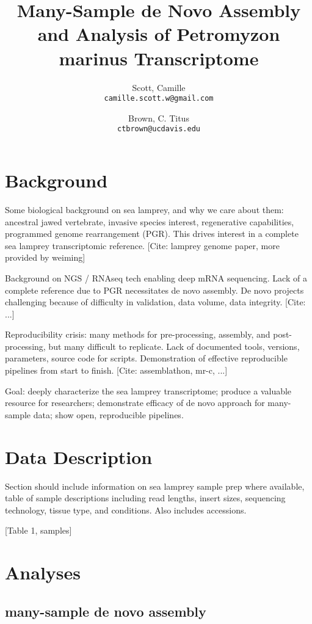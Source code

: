 \documentclass{article}
\title{Many-Sample de Novo Assembly and Analysis of Petromyzon marinus Transcriptome}
\author{
    Scott, Camille\\
    \texttt{camille.scott.w@gmail.com}   %
    \and
    Brown, C. Titus\\
    \texttt{ctbrown@ucdavis.edu}
}
\begin{document}
\maketitle

\section*{Background}

Some biological background on sea lamprey, and why we care about them: ancestral jawed vertebrate, invasive species interest, regenerative capabilities, programmed genome rearrangement (PGR). This drives interest in a complete sea lamprey transcriptomic reference. [Cite: lamprey genome paper, more provided by weiming]

Background on NGS / RNAseq tech enabling deep mRNA sequencing. Lack of a complete reference due to PGR necessitates de novo assembly. De novo projects challenging because of difficulty in validation, data volume, data integrity. [Cite: ...]

Reproducibility crisis: many methods for pre-processing, assembly, and post-processing, but many difficult to replicate. Lack of documented tools, versions, parameters, source code for scripts. Demonstration of effective reproducible pipelines from start to finish. [Cite: assemblathon, mr-c, ...]

Goal: deeply characterize the sea lamprey transcriptome; produce a valuable resource for researchers; demonstrate efficacy of de novo approach for many-sample data; show open, reproducible pipelines.

\section*{Data Description}

Section should include information on sea lamprey sample prep where available, table of sample descriptions including read lengths, insert sizes, sequencing technology, tissue type, and conditions. Also includes accessions.

[Table 1, samples]

\section*{Analyses}

\subsection*{many-sample de novo assembly}
\end{document}
